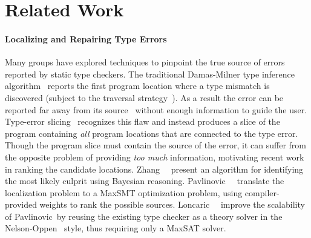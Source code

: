 \section{Related Work}
\label{sec:related-work}


\paragraph{Localizing and Repairing Type Errors}
\label{sec:diagnosis-repair}
%
Many groups have explored techniques to pinpoint the true source
of errors reported by static type checkers.
%
The traditional Damas-Milner type inference algorithm~\cite{Damas1982-uw}
reports the first program location where a type mismatch is discovered
(subject to the traversal strategy~\cite{Lee1998-ys}).
%
As a result the error can be reported far away from its
source~\cite{McAdam1998-ub} without enough information to guide the
user.
%
Type-error slicing~\cite{Haack2003-vc,Schilling2011-yf,Rahli2015-tt,Sagonas2013-bf,Gast2004-zd,Neubauer2003-xv}
recognizes this flaw and instead produces a slice of the program
containing \emph{all} program locations that are connected to the type
error.
%
%
Though the program slice must contain the source of the error, it can
suffer from the opposite problem of providing \emph{too much}
information, motivating recent work in ranking the candidate locations.
%
Zhang~\etal~ present an algorithm for
identifying the most likely culprit using Bayesian reasoning.
%
Pavlinovic~\etal~
translate the %
localization problem to a MaxSMT optimization problem, using
compiler-provided weights to rank the possible sources.
%
Loncaric~\etal~ improve the scalability of
Pavlinovic~\etal by reusing the existing type checker as
a theory solver in the Nelson-Oppen~
style, thus requiring only a MaxSAT solver.

